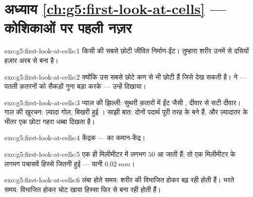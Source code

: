 \section*{अध्याय \ref{ch:g5:first-look-at-cells} --- कोशिकाओं पर पहली नज़र}

\begin{solution}{exo:g5:first-look-at-cells:1}
किसी  की सबसे छोटी जीवित निर्माण-ईंट। तुम्हारा शरीर उनमें से दसियों
हज़ार अरब से बना है।
\end{solution}

\begin{solution}{exo:g5:first-look-at-cells:2}
क्योंकि  उस सबसे छोटे कण से भी छोटी हैं जिसे  देख सकती है।
 ने --- पतली क़तरनों को सैकड़ों गुना बड़ा करके --- उन्हें
दिखाया।
\end{solution}

\begin{solution}{exo:g5:first-look-at-cells:3}
प्याज़ की झिल्ली: सुथरी क़तारों में ईंट जैसी , दीवार से सटी
दीवार। गाल की खुरचन: ज़्यादा गोल, बिखरी हुई । साझी बात: दोनों
पदार्थ पूरी तरह  के बने हैं, और ज़्यादातर  के भीतर एक
छोटा गहरा धब्बा दिखता है।
\end{solution}

\begin{solution}{exo:g5:first-look-at-cells:4}
केंद्रक ---  का कमान-केंद्र।
\end{solution}

\begin{solution}{exo:g5:first-look-at-cells:5}
एक ही मिलीमीटर में लगभग $50$  आ जाती हैं; तो एक 
मिलीमीटर के लगभग पचासवें हिस्से जितनी हुई --- यानी $\qty{0.02}{mm}$।
\end{solution}

\begin{solution}{exo:g5:first-look-at-cells:6}
लंबा होते समय: शरीर की  विभाजित होकर बढ़ रही होती हैं। भरते
समय:  विभाजित होकर चोट खाया हिस्सा फिर से बना रही होती हैं।
\end{solution}

